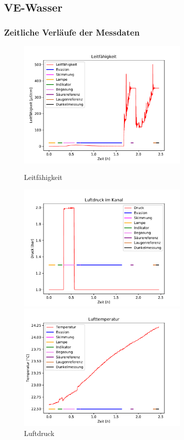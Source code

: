 \documentclass[12pt]{article}
\begin{document}
\subsection{VE-Wasser}
\subsubsection{Zeitliche Verl\"aufe der Messdaten}

\begin{figure}[H]
	\centering
	\parbox{82.5mm}{
		\centering
		\includegraphics[width=82.5mm]{VE-Wasser/Leitfaehigkeit}
		\caption{Leitf\"ahigkeit}
	}
	\hfill%
	\parbox{82.5mm}{
		\centering
		\includegraphics[width=82.5mm]{VE-Wasser/Luftdruck}
		\caption{Luftdruck}
	}
	\centering
	\parbox{82.5mm}{
		\centering
		\includegraphics[width=82.5mm]{VE-Wasser/Lufttemperatur}
}
\end{figure}
\end{document}
